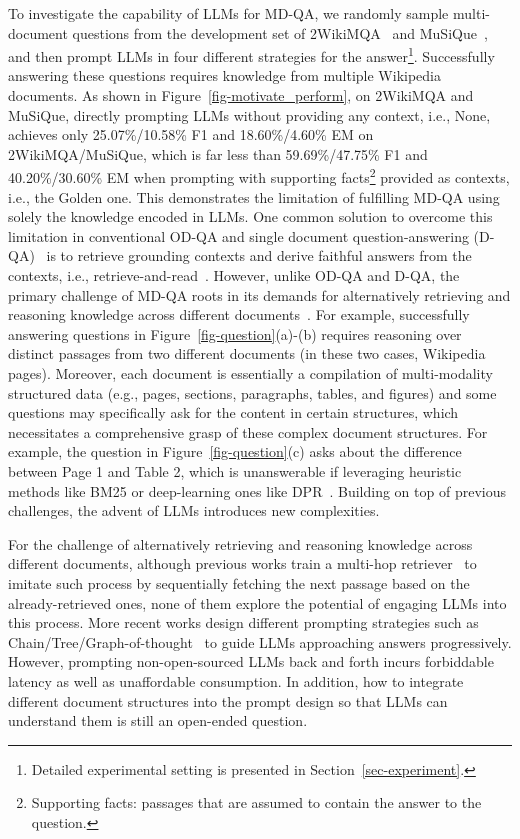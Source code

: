 To investigate the capability of LLMs for MD-QA, we randomly sample multi-document questions from the development set of 2WikiMQA~\cite{ho2020constructing} and MuSiQue~\cite{trivedi2022musique}, and then prompt LLMs in four different strategies for the answer\footnote{Detailed experimental setting is presented in Section~\ref{sec-experiment}.}. Successfully answering these questions requires knowledge from multiple Wikipedia documents. As shown in Figure~\ref{fig-motivate_perform}, on 2WikiMQA and MuSiQue, directly prompting LLMs without providing any context, i.e., None, achieves only 25.07\%/10.58\% F1 and 18.60\%/4.60\% EM on 2WikiMQA/MuSiQue, which is far less than 59.69\%/47.75\% F1 and 40.20\%/30.60\% EM when prompting with supporting facts\footnote{Supporting facts: passages that are assumed to contain the answer to the question.} provided as contexts, i.e., the Golden one. This demonstrates the limitation of fulfilling MD-QA using solely the knowledge encoded in LLMs. One common solution to overcome this limitation in conventional OD-QA and single document question-answering (D-QA)~\cite{xu2020layoutlmv2, mathew2021docvqa} is to retrieve grounding contexts and derive faithful answers from the contexts, i.e., retrieve-and-read~\cite{zhu2021retrieving, ju2022grape}. However, unlike OD-QA and D-QA, the primary challenge of MD-QA roots in its demands for alternatively retrieving and reasoning knowledge across different documents~\cite{pereira2023visconde, caciularu2023peek}. For example, successfully answering questions in Figure~\ref{fig-question}(a)-(b)  requires reasoning over distinct passages from two different documents (in these two cases, Wikipedia pages). Moreover, each document is essentially a compilation of multi-modality structured data (e.g., pages, sections, paragraphs, tables, and figures) and some questions may specifically ask for the content in certain structures, which necessitates a comprehensive grasp of these complex document structures. For example, the question in Figure~\ref{fig-question}(c) asks about the difference between Page 1 and Table 2, which is unanswerable if leveraging heuristic methods like BM25 or deep-learning ones like DPR~\cite{karpukhin2020dense}. Building on top of previous challenges, the advent of LLMs introduces new complexities.



For the challenge of alternatively retrieving and reasoning knowledge across different documents, although previous works train a multi-hop retriever~\cite{xiong2020answering, yavuz2022modeling} to imitate such process by sequentially fetching the next passage based on the already-retrieved ones, none of them explore the potential of engaging LLMs into this process. More recent works design different prompting strategies such as Chain/Tree/Graph-of-thought~\cite{trivedi2022interleaving, wei2022chain, yao2023tree, yao2023beyond} to guide LLMs approaching answers progressively. However, prompting non-open-sourced LLMs back and forth incurs forbiddable latency as well as unaffordable consumption. In addition, how to integrate different document structures into the prompt design so that LLMs can understand them is still an open-ended question.

